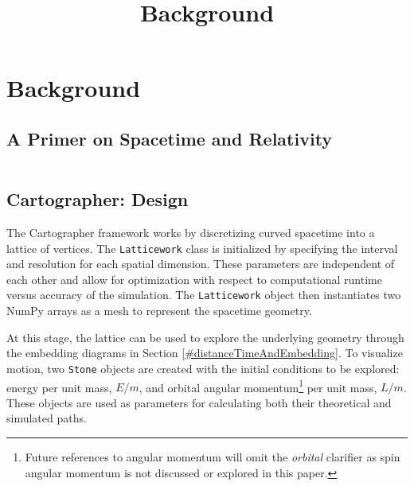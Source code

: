 \documentclass[
]{article}
\title{Background}
\author{}
\date{}
\begin{document}
\maketitle

{
\setcounter{tocdepth}{3}
\tableofcontents
}
\captionsetup{format=hang,indention=-0.5cm}
\onehalfspacing
\setlength{\parskip}{1.5em}

\hypertarget{background}{%
\section{Background}\label{background}}

\hypertarget{primer}{%
\subsection{A Primer on Spacetime and Relativity}\label{primer}}

\[\ \]

\pagebreak

\hypertarget{cartographer-design}{%
\subsection{Cartographer: Design}\label{cartographer-design}}

The Cartographer framework works by discretizing curved spacetime into a
lattice of vertices. The \texttt{Latticework} class is initialized by
specifying the interval and resolution for each spatial dimension. These
parameters are independent of each other and allow for optimization with
respect to computational runtime versus accuracy of the simulation. The
\texttt{Latticework} object then instantiates two NumPy arrays as a mesh
to represent the spacetime geometry.

At this stage, the lattice can be used to explore the underlying
geometry through the embedding diagrams in Section
\ref{#distanceTimeAndEmbedding}. To visualize motion, two \texttt{Stone}
objects are created with the initial conditions to be explored: energy
per unit mass, \(E/m\), and orbital angular momentum\footnote{Future
  references to angular momentum will omit the \emph{orbital} clarifier
  as spin angular momentum is not discussed or explored in this paper.}
per unit mass, \(L/m\). These objects are used as parameters for
calculating both their theoretical and simulated paths.
\end{document}
